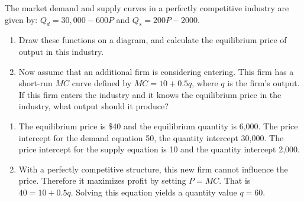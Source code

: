 \begin{enumialphparenastyle}
\begin{ex}\label{ex:ch9ex7}
The market demand and supply curves in a perfectly competitive industry are given by: $Q_d=30,000-600P$ and $Q_s=200P-2000$.
\begin{enumerate}
	\item	Draw these functions on a diagram, and calculate the equilibrium price of output in this industry.
	\item	Now assume that an additional firm is considering entering. This firm has a short-run $MC$ curve defined by $MC=10+0.5q$, where $q$ is the firm's output. If this firm enters the industry and it knows the equilibrium price in the industry, what output should it produce?
\end{enumerate}
\begin{sol}
\begin{enumerate}
	\item	The equilibrium price is \$40 and the equilibrium quantity is 6,000. The price intercept for the demand equation 50, the quantity intercept 30,000. The price intercept for the supply equation is 10 and the quantity intercept 2,000.
	\item	With a perfectly competitive structure, this new firm cannot influence the price. Therefore it maximizes profit by setting $P=MC$. That is $40=10+0.5q$. Solving this equation yields a quantity value $q=60$.
\end{enumerate}
\end{sol}
\end{ex}


\end{enumialphparenastyle}
